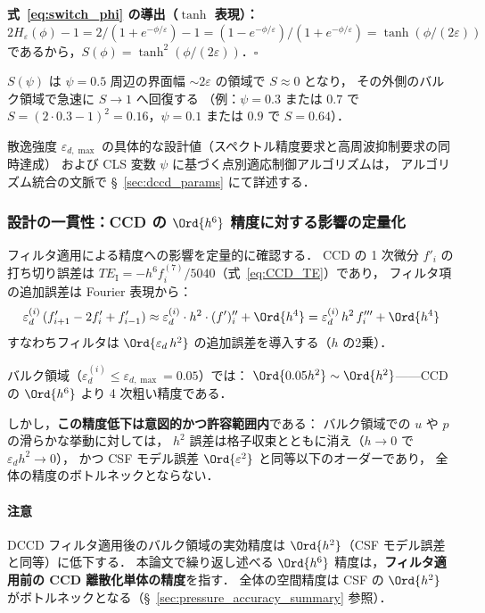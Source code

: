 \noindent\textbf{式~\eqref{eq:switch_phi} の導出（$\tanh$ 表現）：}
$2H_\varepsilon(\phi) - 1 = 2/(1+e^{-\phi/\varepsilon}) - 1
= (1 - e^{-\phi/\varepsilon})/(1 + e^{-\phi/\varepsilon})
= \tanh(\phi/(2\varepsilon))$
であるから，$S(\phi) = \tanh^2(\phi/(2\varepsilon))$．$\square$

\medskip
$S(\psi)$ は $\psi = 0.5$ 周辺の界面幅 $\sim 2\varepsilon$ の領域で $S \approx 0$ となり，
その外側のバルク領域で急速に $S \to 1$ へ回復する
（例：$\psi = 0.3$ または $0.7$ で $S = (2\cdot 0.3-1)^2 = 0.16$，$\psi = 0.1$ または $0.9$ で $S = 0.64$）．

散逸強度 $\varepsilon_{d,\max}$ の具体的な設計値（スペクトル精度要求と高周波抑制要求の同時達成）
および CLS 変数 $\psi$ に基づく点別適応制御アルゴリズムは，
アルゴリズム統合の文脈で §~\ref{sec:dccd_params} にて詳述する．

\subsubsection{設計の一貫性：CCD の \texorpdfstring{$\Ord{h^6}$}{O(h\textasciicircum 6)} 精度に対する影響の定量化}
\label{sec:dccd_accuracy_impact}

フィルタ適用による精度への影響を定量的に確認する．
CCD の 1 次微分 $f'_i$ の打ち切り誤差は $TE_\mathrm{I} = -h^6 f^{(7)}_i/5040$（式~\eqref{eq:CCD_TE}）であり，
フィルタ項の追加誤差は Fourier 表現から：
\begin{equation}
  \varepsilon_d^{(i)}\,(f'_{i+1} - 2f'_i + f'_{i-1})
  \approx \varepsilon_d^{(i)} \cdot h^2 \cdot (f')''_i + \Ord{h^4}
  = \varepsilon_d^{(i)}\,h^2\,f'''_i + \Ord{h^4}
  \label{eq:dccd_accuracy_error}
\end{equation}
すなわちフィルタは $\Ord{\varepsilon_d\,h^2}$ の追加誤差を導入する（$h$ の2乗）．

バルク領域（$\varepsilon_d^{(i)} \leq \varepsilon_{d,\max} = 0.05$）では：
$\Ord{0.05h^2} \sim \Ord{h^2}$——CCD の $\Ord{h^6}$ より 4 次粗い精度である．

しかし，\textbf{この精度低下は意図的かつ許容範囲内}である：
バルク領域での $u$ や $p$ の滑らかな挙動に対しては，
$h^2$ 誤差は格子収束とともに消え（$h \to 0$ で $\varepsilon_d h^2 \to 0$），
かつ CSF モデル誤差 $\Ord{\varepsilon^2}$ と同等以下のオーダーであり，
全体の精度のボトルネックとならない．

\paragraph{注意}
DCCD フィルタ適用後のバルク領域の実効精度は $\Ord{h^2}$（CSF モデル誤差と同等）に低下する．
本論文で繰り返し述べる $\Ord{h^6}$ 精度は，\textbf{フィルタ適用前の CCD 離散化単体の精度}を指す．
全体の空間精度は CSF の $\Ord{h^2}$ がボトルネックとなる（§~\ref{sec:pressure_accuracy_summary} 参照）．

